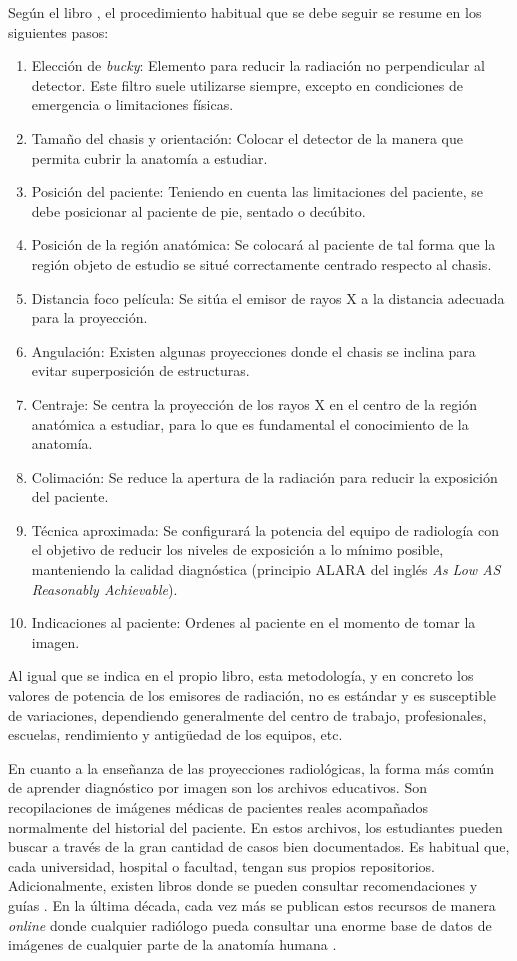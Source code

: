 Según el libro \cite{manualpractico}, el procedimiento habitual que se debe seguir se resume en los siguientes pasos:
\begin{enumerate}
    \item Elección de \emph{bucky}: Elemento para reducir la radiación no perpendicular al detector. Este filtro suele utilizarse siempre, excepto en condiciones de emergencia o limitaciones físicas.
    \item Tamaño del chasis y orientación: Colocar el detector de la manera que permita cubrir la anatomía a estudiar.
    \item Posición del paciente: Teniendo en cuenta las limitaciones del paciente, se debe posicionar al paciente de pie, sentado o decúbito.
    \item Posición de la región anatómica: 
    Se colocará al paciente de tal forma que la región objeto de estudio se situé correctamente centrado respecto al chasis.
    \item Distancia foco película: Se sitúa el emisor de rayos X a la distancia adecuada para la proyección.
    \item Angulación: Existen algunas proyecciones donde el chasis se inclina para evitar superposición de estructuras.
    \item Centraje: Se centra la proyección de los rayos X en el centro de la región anatómica a estudiar, para lo que es fundamental el conocimiento de la anatomía.
    \item Colimación: Se reduce la apertura de la radiación para reducir la exposición del paciente.
    \item Técnica aproximada: Se configurará la potencia del equipo de radiología con el objetivo de reducir los niveles de exposición a lo mínimo posible, manteniendo la calidad diagnóstica (principio ALARA del inglés \emph{As Low AS Reasonably Achievable}\cite{manualpractico}). 
    \item Indicaciones al paciente: Ordenes al paciente en el momento de tomar la imagen.
\end{enumerate}
Al igual que se indica en el propio libro, esta metodología, y en concreto los valores de potencia de los emisores de radiación, no es estándar y es susceptible de variaciones, dependiendo generalmente del centro de trabajo, profesionales, escuelas, rendimiento y antigüedad de los equipos, etc. 

En cuanto a la enseñanza de las proyecciones radiológicas, la forma más común de aprender diagnóstico por imagen son los archivos educativos. Son recopilaciones de imágenes médicas de pacientes reales acompañados normalmente del historial del paciente. En estos archivos, los estudiantes pueden buscar a través de la gran cantidad de casos bien documentados. Es habitual que, cada universidad, hospital o facultad, tengan sus propios repositorios. Adicionalmente, existen libros donde se pueden consultar recomendaciones y guías \cite{carver2012medical,manualpractico}.
En la última década, cada vez más se publican estos recursos de manera \emph{online} donde cualquier radiólogo pueda consultar una enorme base de datos de imágenes de cualquier parte de la anatomía humana \cite{deshpande2017integrated}. 

